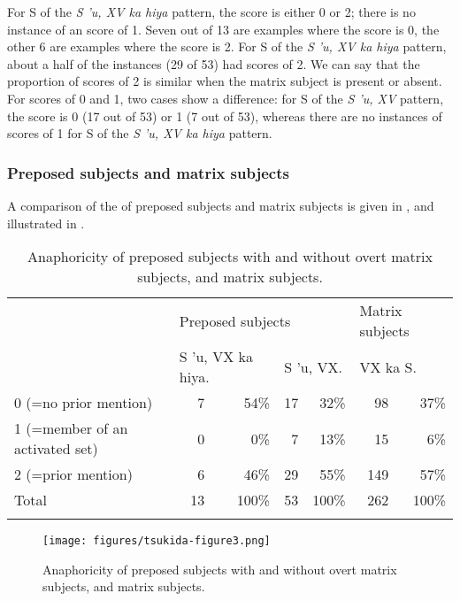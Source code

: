 \documentclass[output=paper
,modfonts
,nonflat]{langsci/langscibook}
\begin{document}
\noindent
For S of the \textit{S 'u, XV ka hiya} pattern, the  score is either 0 or 2; there is no instance of an  score of 1. Seven out of 13 are examples where the score is 0, the other 6 are examples where the score is 2. For S of the \textit{S 'u, XV ka hiya} pattern, about a half of the instances (29 of 53) had scores of 2. We can say that the proportion of scores of 2 is similar when the matrix subject is present or absent. For scores of 0 and 1, two cases show a difference: for S of the \textit{S 'u, XV} pattern, the  score is 0 (17 out of 53) or 1 (7 out of 53), whereas there are no instances of  scores of 1 for S of the \textit{S 'u, XV ka hiya} pattern. 

\subsubsection{\label{s:tsukida:4.3.2}Preposed subjects and matrix subjects}

A comparison of the  of preposed subjects and matrix subjects is given in , and illustrated in . 

\begin{table}
	\begin{tabularx}{\textwidth}{Xrrrrrr} 
		\lsptoprule
		& \multicolumn{4}{l}{Preposed subjects} & \multicolumn{2}{l}{Matrix subjects}\\ \cmidrule{2-5}
		& \multicolumn{2}{l}{S 'u, VX ka hiya.} & \multicolumn{2}{l}{S 'u, VX.} & \multicolumn{2}{l}{VX ka S.}\\
		\midrule
		0 (=no prior mention) &  7 &  54\% &  17 &  32\% &  98 &  37\%\\
		1 (=member of an activated set) &  0 &  0\% &  7 &  13\% &  15 &  6\%\\
		2 (=prior mention) &  6 &  46\% &  29 &  55\% &  149 &  57\%\\
		\midrule
		Total &  13 &  100\% &  53 &  100\% &  262 &  100\%\\
		\lspbottomrule
	\end{tabularx}
	\caption{Anaphoricity of preposed subjects with and without overt  matrix subjects, and matrix subjects.}
	\label{tab:tsukida:8}
\end{table}

\begin{figure}[H]
	\texttt{[image: figures/tsukida-figure3.png]}
	\caption{Anaphoricity of preposed subjects with and without overt matrix subjects, and matrix subjects.}
	\label{fig:tsukida:3}
\end{figure}
\end{document}
